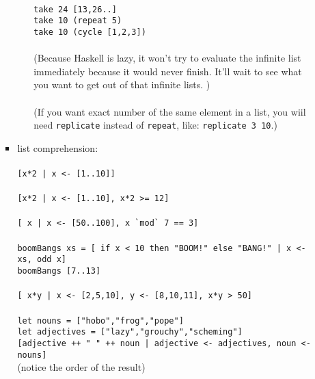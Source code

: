 \documentclass[a4paper,10pt]{article}
\begin{document}
\begin{enumerate}
\begin{enumerate}
\begin{itemize}
\begin{itemize}
   \\\texttt{take 24 [13,26..]}
   \\\texttt{take 10 (repeat 5)}
   \\\texttt{take 10 (cycle [1,2,3])}
   \\\\(Because Haskell is lazy, it won't try to evaluate the infinite list immediately because it would never finish. It'll wait to see what you want to get out of that infinite lists. )
   \\\\(If you want exact number of the same element in a list, you wiil need \texttt{replicate} instead of \texttt{repeat}, like: \texttt{replicate 3 10}.)\\
  \end{itemize}
  \item list comprehension:
  \\\\\texttt{[x*2 | x <- [1..10]]}
  \\\\\texttt{[x*2 | x <- [1..10], x*2 >= 12]}
  \\\\\texttt{[ x | x <- [50..100], x \`{}mod\`{} 7 == 3]}
  \\\\\texttt{boomBangs xs = [ if x < 10 then "BOOM!" else "BANG!" | x <- xs, odd x]}
  \\\texttt{boomBangs [7..13]}
  \\\\\texttt{[ x*y | x <- [2,5,10], y <- [8,10,11], x*y > 50]}
  \\\\\texttt{let nouns = ["hobo","frog","pope"]}
  \\\texttt{let adjectives = ["lazy","grouchy","scheming"]}
  \\\texttt{[adjective ++ " " ++ noun | adjective <- adjectives, noun <- nouns]}
  \\(notice the order of the result)


  \end{itemize}
  \end{enumerate}
\end{enumerate}
\end{document}
